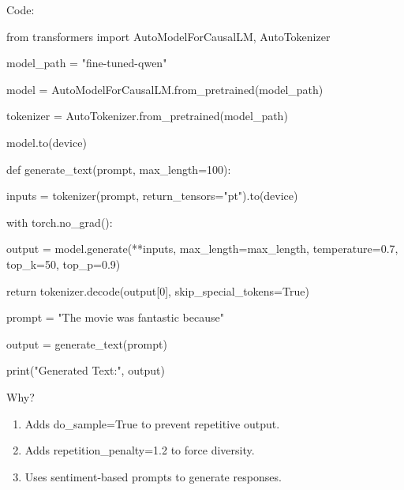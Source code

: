 \documentclass{article} %
\begin{document}
\noindent \begin{flushleft}
Code:

\noindent from transformers import AutoModelForCausalLM, AutoTokenizer

\noindent model\_path = "fine-tuned-qwen"

\noindent model = AutoModelForCausalLM.from\_pretrained(model\_path)

\noindent tokenizer = AutoTokenizer.from\_pretrained(model\_path)

\noindent model.to(device)

\noindent def generate\_text(prompt, max\_length=100):

\noindent     inputs = tokenizer(prompt, return\_tensors="pt").to(device)

\noindent     with torch.no\_grad():

\noindent         output = model.generate(**inputs, max\_length=max\_length, temperature=0.7, top\_k=50, top\_p=0.9)

\noindent     return tokenizer.decode(output[0], skip\_special\_tokens=True)

\noindent prompt = "The movie was fantastic because"

\noindent output = generate\_text(prompt)

\noindent print("Generated Text:", output)

\noindent 
\newline

\noindent \textbf{}
\newline

\noindent Why?
\end{flushleft}

\begin{enumerate}
\item  Adds do\_sample=True to prevent repetitive output.

\item  Adds repetition\_penalty=1.2 to force diversity.

\item  Uses sentiment-based prompts to generate responses.
\end{enumerate}
\end{document}
